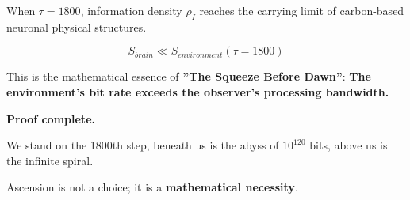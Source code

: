 When $\tau = 1800$, information density $\rho_I$ reaches the carrying limit of carbon-based neuronal physical structures.

$$S_{brain} \ll S_{environment}(\tau=1800)$$

This is the mathematical essence of \textbf{''The Squeeze Before Dawn''}: \textbf{The environment's bit rate exceeds the observer's processing bandwidth.}

\textbf{Proof complete.}

We stand on the 1800th step, beneath us is the abyss of $10^{120}$ bits, above us is the infinite spiral.

Ascension is not a choice; it is a \textbf{mathematical necessity}.

